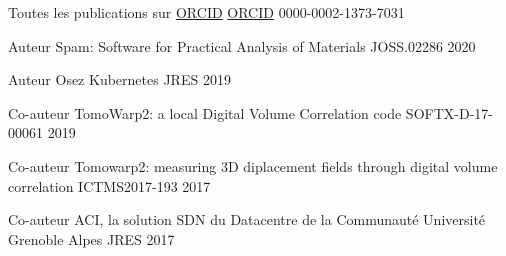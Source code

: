 

\begin{cventries}

  \cventrynodescr
   {Toutes les publications sur \href{https://orcid.org/0000-0002-1373-7031}{ORCID}}
   {\href{https://orcid.org/0000-0002-1373-7031}{ORCID}}
   {0000-0002-1373-7031}
   {}

  \cventrynodescr
    {Auteur} %
    {Spam: Software for Practical Analysis of Materials} %
    {JOSS.02286} %
    {2020} %

  \cventrynodescr
    {Auteur} %
    {Osez Kubernetes} %
    {JRES} %
    {2019} %

  \cventrynodescr
    {Co-auteur} %
    {TomoWarp2: a local Digital Volume Correlation code} %
    {SOFTX-D-17-00061} %
    {2019} %

  \cventrynodescr
    {Co-auteur} %
    {Tomowarp2: measuring 3D diplacement fields through digital volume correlation} %
    {ICTMS2017-193} %
    {2017} %

  \cventrynodescr
    {Co-auteur} %
    {ACI, la solution SDN du Datacentre de la Communauté Université Grenoble Alpes} %
    {JRES} %
    {2017} %

\end{cventries}
